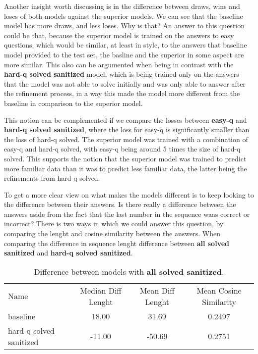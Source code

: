 \documentclass[a4paper,10pt]{article}
\begin{document}
Another insight worth discussing is in the difference between draws, wins and loses of both models against the superior models. We can see that the baseline model has more draws, and less loses. Why is that? An answer to this question could be that, because the superior model is trained on the answers to easy questions, which would be similar, at least in style, to the answers that baseline model provided to the test set, the basline and the superior in some aspect are more similar. This also can be argumented when being in contrast with the \textbf{hard-q solved sanitized} model, which is being trained only on the answers that the model was not able to solve initially and was only able to answer after the refinement process, in a way this made the model more different from the baseline in comparison to the superior model.

This notion can be complemented if we compare the losses between \textbf{easy-q} and \textbf{hard-q solved sanitized}, where the loss for easy-q is significantly smaller than the loss of hard-q solved. The superior model was trained with a combination of easy-q and hard-q solved, with easy-q being around 5 times the size of hard-q solved. This supports the notion that the superior model was trained to predict more familiar data than it was to predict less familiar data, the latter being the refinements from hard-q solved.

To get a more clear view on what makes the models different is to keep looking to the difference between their answers.  Is there really a difference between the answers aside from the fact that the last number in the sequence waas correct or incorrect? There is two ways in which we could answer this question, by comparing the lenght and cosine similarity between the answers. When comparing the difference in sequence lenght difference between \textbf{all solved sanitized} and \textbf{hard-q solved sanitized}.

\begin{table}[ht]
\centering
 \begin{tabular}{lccc}
 Name  & Median Diff Lenght & Mean Diff Lenght & Mean Cosine Similarity \\
 baseline & 18.00 & 31.69  & 0.2497 \\
 hard-q solved sanitized & -11.00 & -50.69 & 0.2751 \\
 \end{tabular}
 \caption{Difference between models with \textbf{all solved sanitized}. }
\end{table}
\end{document}

